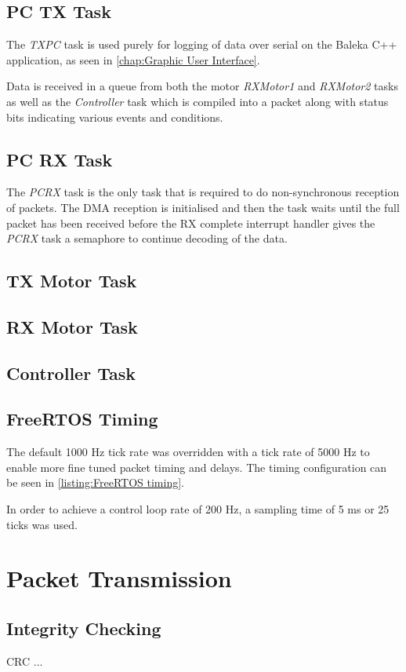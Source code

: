 \subsection{PC TX Task}
The \textit{TXPC} task is used purely for logging of data over serial on the Baleka C++ application, as seen in \cref{chap:Graphic User Interface}. 

Data is received in a queue from both the motor \textit{RXMotor1} and \textit{RXMotor2} tasks as well as the \textit{Controller} task which is compiled into a packet along with status bits indicating various events and conditions. 

\subsection{PC RX Task}
The \textit{PCRX} task is the only task that is required to do non-synchronous reception of packets. The DMA reception is initialised and then the task waits until the full packet has been received before the RX complete interrupt handler gives the \textit{PCRX} task a semaphore to continue decoding of the data.

\subsection{TX Motor Task}
\subsection{RX Motor Task}
\subsection{Controller Task}

\subsection{FreeRTOS Timing}

The default 1000 Hz tick rate was overridden with a tick rate of 5000 Hz to enable more fine tuned packet timing and delays. The timing configuration can be seen in \cref{listing:FreeRTOS timing}. 

In order to achieve a control loop rate of 200 Hz, a sampling time of 5 ms or 25 ticks was used.

\section{Packet Transmission}
\subsection{Integrity Checking}
CRC ...

